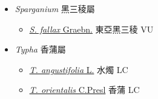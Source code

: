 
  \begin{itemize}
 \item[] \textit{Sparganium} 黑三稜屬
                                
  \begin{itemize}
        \item[] \href{http://www.theplantlist.org/tpl1.1/search?q=Sparganium+fallax}{\textit{S. fallax} Graebn.}   東亞黑三稜   VU
  \end{itemize}
 \item[] \textit{Typha} 香蒲屬
                                
  \begin{itemize}
        \item[] \href{http://www.theplantlist.org/tpl1.1/search?q=Typha+angustifolia}{\textit{T. angustifolia} L.}   水燭   LC
        \item[] \href{http://www.theplantlist.org/tpl1.1/search?q=Typha+orientalis}{\textit{T. orientalis} C.Presl}   香蒲   LC
  \end{itemize}
  \end{itemize}
